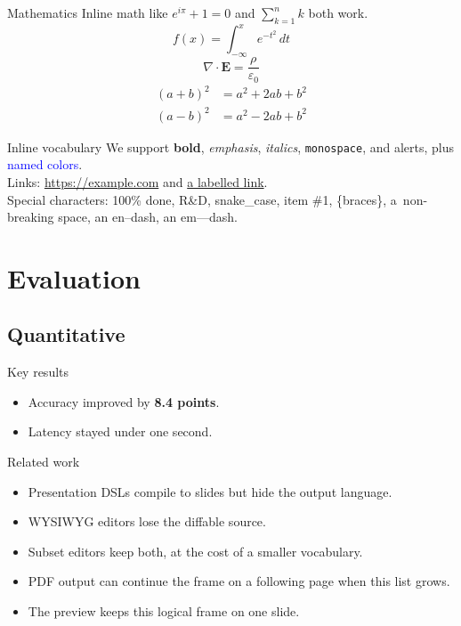 \documentclass[aspectratio=169]{beamer}
\begin{document}
\begin{frame}{Mathematics}
  Inline math like $e^{i\pi} + 1 = 0$ and \(\textstyle\sum_{k=1}^{n} k\) both work.
  \[
    f(x) = \int_{-\infty}^{x} e^{-t^{2}} \, dt
  \]
  \begin{equation*}
    \nabla \cdot \mathbf{E} = \frac{\rho}{\varepsilon_{0}}
  \end{equation*}
  \begin{align*}
    (a + b)^{2} &= a^{2} + 2ab + b^{2} \\
    (a - b)^{2} &= a^{2} - 2ab + b^{2}
  \end{align*}
\end{frame}

\begin{frame}{Inline vocabulary}
  We support \textbf{bold}, \emph{emphasis}, \textit{italics}, \texttt{monospace},
  and \alert{alerts}, plus \textcolor{blue}{named colors}.\\
  Links: \url{https://example.com} and \href{https://example.com}{a labelled link}.\\
  Special characters: 100\% done, R\&D, snake\_case, item \#1, \{braces\},
  a~non-breaking space, an en--dash, an em---dash.
\end{frame}

\section{Evaluation}

\subsection{Quantitative}

\begin{frame}[label=results]{Key results}
  \begin{itemize}
    \item Accuracy improved by \textbf{8.4 points}.
    \item Latency stayed under one second.
  \end{itemize}
\end{frame}

\begin{frame}[allowframebreaks]{Related work}
  \begin{itemize}
    \item Presentation DSLs compile to slides but hide the output language.
    \item WYSIWYG editors lose the diffable source.
    \item Subset editors keep both, at the cost of a smaller vocabulary.
    \item PDF output can continue the frame on a following page when this list grows.
    \item The preview keeps this logical frame on one slide.
  \end{itemize}
\end{frame}
\end{document}
